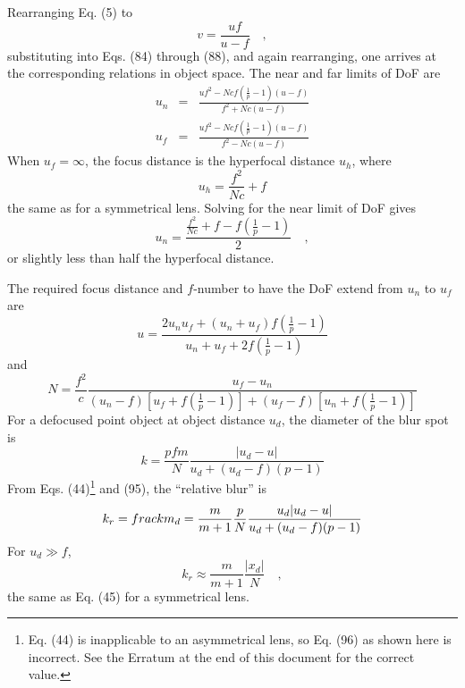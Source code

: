 \documentclass[11pt, oneside]{scrartcl}   	%
\begin{document}
Rearranging Eq. (5) to
\begin{equation}
  \label{eq:5v}
  v = \frac{uf}{u-f}\quad,
\end{equation}
%
substituting into Eqs. (84) through (88), and again rearranging, one
arrives at the corresponding relations in object space. The near and
far limits of DoF are
\begin{eqnarray}
     u_n & = & \frac{uf^2-N\!cf\left(\frac1p-1\right)(u-f)}{f^2 + N\!c(u-f)}\label{eq:89}\\
     u_f & = & \frac{uf^2-N\!cf\left(\frac1p-1\right)(u-f)}{f^2 - N\!c(u-f)}\label{eq:90}
\end{eqnarray}
When $u_f = \infty$, the focus distance is the hyperfocal distance
$u_h$, where
\begin{equation}
  \label{eq:uh2}
  u_h = \frac{f^2}{N\!c} + f
\end{equation}
the same as for a symmetrical lens. Solving for the near limit of DoF
gives
\begin{equation}
  \label{eq:3un}
  u_n = \frac{\frac{f^2}{N\!c} + f - f\left(\frac1p-1\right)}2\quad,
\end{equation}
or slightly less than half the hyperfocal distance.

The required focus distance and $f$-number to have the DoF extend from
$u_n$ to $u_f$ are
\begin{equation}
  \label{eq:93}
  u = \frac{2u_nu_f +
    (u_n+u_f)f\left(\frac1p-1\right)}{u_n+u_f+2f\left(\frac1p-1\right)}
\end{equation}
and
\begin{equation}
  \label{eq:94}
  N=\frac{f^2}c\frac{u_f-u_n}{(u_n-f)\left[u_f+f\left(\frac1p-1\right)\right]+(u_f-f)\left[u_n+f\left(\frac1p-1\right)\right]}
\end{equation}
For a defocused point object at object distance $u_d$, the diameter of
the blur spot is
\begin{equation}
  \label{eq:95}
  k  = \frac{pfm}N\frac{|u_d-u|}{u_d+(u_d-f)(p-1)}
\end{equation}
From Eqs. (44)\footnote{Eq. (44) is inapplicable to an asymmetrical lens, so Eq. (96) as
shown here is incorrect. See the Erratum at the end
of this document for the correct value.} and (95), the “relative blur”
is
\begin{equation}
  \label{eq:96}
  k_r=\\frac k {m_d} = \frac m{m+1} \frac p N
  \frac{u_d|u_d-u|}{u_d+(u_d-f)(p-1)}
\end{equation}
For $u_d \gg f$,
\begin{equation}
  \label{eq:97}
  k_r\approx \frac m{m+1} \frac{|x_d|}N\quad,
\end{equation}
the same as Eq. (45) for a symmetrical lens.
\end{document}
